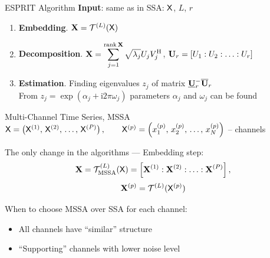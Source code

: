 \documentclass[pdf, unicode, ucs, notheorems]{beamer}
\theoremstyle{definition}
\begin{document}
\begin{frame}{ESPRIT Algorithm}
  \textbf{Input}: same as in SSA: $\mathsf{X}$, $L$, $r$
  \begin{enumerate}
    \item \textbf{Embedding}. $\mathbf{X} = \mathcal{T}^{(L)}(\mathsf{X})$
    \item \textbf{Decomposition}.
      $\displaystyle\mathbf{X} = \sum_{j=1}^{\operatorname{rank}\mathbf{X}}
      \sqrt{\lambda_j} U_j V_j^{\mathrm{H}}$,
      $\mathbf{U}_r = \left[U_1: U_2: \ldots: U_r\right]$
    \item \textbf{Estimation}. Finding eigenvalues $z_j$ of matrix
      $\underline{\mathbf{U}}_r^{-}\overline{\mathbf{U}}_r$ \\ \smallskip
      From $z_j = \exp(\alpha_j + \mathrm{i}2\pi\omega_j)$
      parameters $\alpha_j$ and $\omega_j$ can be found
  \end{enumerate}
\end{frame}

\begin{frame}{Multi-Channel Time Series, MSSA}
  $\mathsf{X} = \left(\mathsf{X}^{(1)},\, \mathsf{X}^{(2)}, \, \ldots,\,
  \mathsf{X}^{(P)}\right), \qquad\mathsf{X}^{(p)} = \left(x_1^{(p)}, \, x_2^{(p)},\,
  \ldots,\,  x_N^{(p)}\right)$ -- channels
  \vspace{0.4cm}

  The only change in the algorithms --- Embedding step:
  \[
    \mathbf{X} = \mathcal{T}_{\textrm{MSSA}}^{(L)}(\mathsf{X}) = \left[\mathbf{X}^{(1)} :
    \mathbf{X}^{(2)}: \ldots : \mathbf{X}^{(P)}\right],
  \]
  \[
    \mathbf{X}^{(p)} = \mathcal{T}^{(L)}(\mathsf{X}^{(p)})
  \]
  \vspace{0.4cm}

  When to choose MSSA over SSA for each channel:
  \begin{itemize}
    \item All channels have ``similar'' structure
    \item ``Supporting'' channels with lower noise level
  \end{itemize}
\end{frame}
\end{document}
